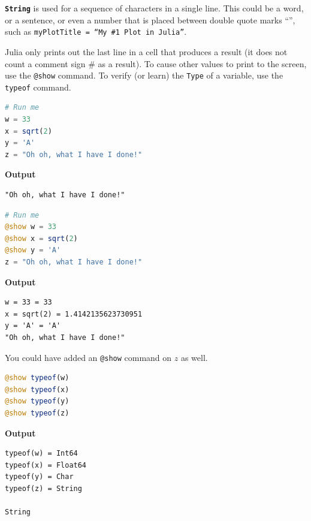 \texttt{\bf String} is used for a sequence of characters in a single line. This could be a word, or a sentence, or even a number that is placed between double quote marks  ``\hspace*{.3cm}'', such as \texttt{myPlotTitle = ``My \#1  Plot in Julia''}.

\begin{rem}
Julia only prints out the last line in a cell that produces a result (it does not count a comment sign \# as a result). To cause other values to print to the screen, use the \texttt{@show} command. To verify (or learn) the \texttt{Type} of a variable, use the \texttt{typeof} command.
\end{rem}




\begin{lstlisting}[language=Julia,style=mystyle]
# Run me
w = 33
x = sqrt(2)
y = 'A'
z = "Oh oh, what I have I done!"
\end{lstlisting}
\textbf{Output} 
\begin{verbatim}
"Oh oh, what I have I done!"
\end{verbatim}



\begin{lstlisting}[language=Julia,style=mystyle]
# Run me
@show w = 33
@show x = sqrt(2)
@show y = 'A'
z = "Oh oh, what I have I done!"
\end{lstlisting}
\textbf{Output} 
\begin{verbatim}
w = 33 = 33
x = sqrt(2) = 1.4142135623730951
y = 'A' = 'A'
"Oh oh, what I have I done!"
\end{verbatim}

You could have added an \texttt{@show} command on $z$ as well. 
\begin{lstlisting}[language=Julia,style=mystyle]
@show typeof(w)
@show typeof(x)
@show typeof(y)
@show typeof(z)
\end{lstlisting}
\textbf{Output} 
\begin{verbatim}
typeof(w) = Int64
typeof(x) = Float64
typeof(y) = Char
typeof(z) = String

String
\end{verbatim}

